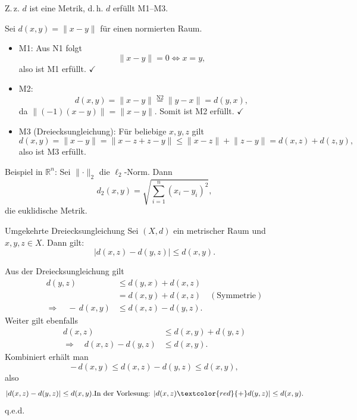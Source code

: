 \begin{beweisbox}
    Z.\,z. $d$ ist eine Metrik, d.\,h. $d$ erfüllt M1--M3.

    Sei $d(x,y)=\lVert x-y\rVert$ für einen normierten Raum.

    \begin{itemize}
    \item M1: Aus N1 folgt
        $$
        \lVert x-y\rVert = 0 \iff x=y,
        $$
        also ist M1 erfüllt. $\checkmark$

    \item M2: 
        $$
        d(x,y)=\lVert x-y\rVert \overset{\text{N2}}{=} \lVert y-x\rVert = d(y,x),
        $$
        da $\lVert(-1)(x-y)\rVert=\lVert x-y\rVert$. Somit ist M2 erfüllt. $\checkmark$

    \item M3 (Dreiecksungleichung):
        Für beliebige $x,y,z$ gilt
        $$
        d(x,y)=\lVert x-y\rVert = \lVert x-z + z-y\rVert \le \lVert x-z\rVert + \lVert z-y\rVert
        = d(x,z)+d(z,y),
        $$
        also ist M3 erfüllt.
    \end{itemize}

    Beispiel in $\mathbb{R}^n$: Sei $\lVert\cdot\rVert_2$ die $\ell_2$-Norm. Dann
    $$
    d_2(x,y)=\sqrt{\sum_{i=1}^n (x_i-y_i)^2},
    $$
    die euklidische Metrik.
\end{beweisbox}

\begin{lemma}{Umgekehrte Dreiecksungleichung}
    Sei $(X,d)$ ein metrischer Raum und $x,y,z \in X$. Dann gilt:
    $$
        |d(x,z) - d(y,z)| \le d(x,y).
    $$
\end{lemma}

\begin{beweisbox}
    Aus der Dreiecksungleichung gilt
    \begin{align*}
    d(y,z) &\le d(y,x)+d(x,z) \\
        &= d(x,y)+d(x,z) \quad(\text{Symmetrie})\\
    \Rightarrow\quad -\,d(x,y)&\le d(x,z)-d(y,z).
    \end{align*}
    Weiter gilt ebenfalls
    \begin{align*}
    d(x,z) &\le d(x,y)+d(y,z) \\
    \Rightarrow\quad d(x,z)-d(y,z)&\le d(x,y).
    \end{align*}
    Kombiniert erhält man
    $$
    -\,d(x,y)\le d(x,z)-d(y,z)\le d(x,y),
    $$
    also
    $$
    \lvert d(x,z) - d(y,z)\rvert \le d(x,y).
    \text{In der Vorlesung: }\lvert d(x,z) \textcolor{red}{+} d(y,z)\rvert \le d(x,y).
    $$
    q.e.d.
\end{beweisbox}

